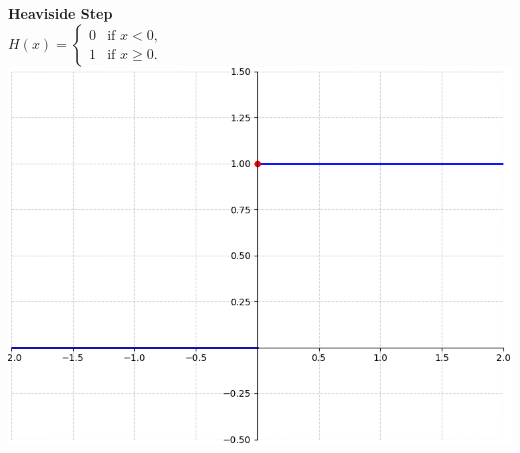\documentclass[8pt]{article}
\begin{document}
\hfill
\begin{minipage}[t]{0.24\textwidth}
    \textbf{Heaviside Step}\\
    $H(x) =
    \begin{cases}
      0 & \text{if } x < 0,\\
      1 & \text{if } x \geq 0.
    \end{cases}$ \\
    \includegraphics[width=1.05\linewidth]{images/heaviside.png}
\end{minipage}
\setlength{\parindent}{0pt}
\setlength{\parskip}{0pt}



\footnotesize  %

\begingroup
\setlength{\abovedisplayskip}{3pt}
\setlength{\belowdisplayskip}{3pt}
\setlength{\abovedisplayshortskip}{2pt}
\setlength{\belowdisplayshortskip}{2pt}
\end{document}
